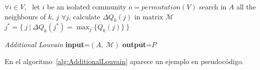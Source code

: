 \begin{algorithm}
\begin{algorithmic}[1]
\STATE $\forall i \in V$, \ let $i$ be an isolated community
\STATE $o=permutation(V)$
\STATE search in $A$ all the neighbours of $k$, $j$
\STATE $\forall j$, calculate $\Delta Q_k(j)$ in matrix $\mathcal{M}$
\STATE $j^*=\{ \ j \ | \ \Delta Q_k(j^*)=\max_j\{Q_k(j)\} \ \}$
\ELSE
{}
\ENDIF
\ENDFOR
\end{algorithmic}\caption{\textit{Additional Louvain} \textbf{input}=$\left(A, \ \mathcal{M}\right)$ \textbf{output}=$P$}
\label{alg:AdditionalLouvain}
\end{algorithm}
En el algoritmo~\ref{alg:AdditionalLouvain} aparece un ejemplo en pseudocódigo.